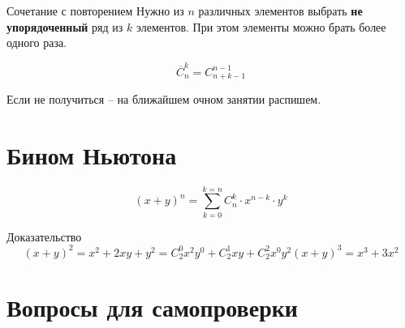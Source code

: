 \begin{frame}{Сочетание с повторением}
Нужно из
$n$
различных элементов 
выбрать \textbf{не упорядоченный}
ряд из $k$
элементов.
При этом элементы можно брать более одного раза.

\begin{equation}
\overline{C}_n^k = C_{n+k-1}^{n-1}
\end{equation}

Если не получиться -- на ближайшем очном занятии распишем.
	
\end{frame}

\section{Бином Ньютона}

\begin{frame}

\begin{equation}
\left( x + y\right)^n = \sum_{k=0}^{k=n} C_n^k \cdot x^{n-k} \cdot y^{k}
\end{equation}

Доказательство
\begin{equation*}
\left( x + y\right)^2 = x^2 + 2xy + y^2 = C_{2}^0 x^2 y^0 + C_{2}^{1} xy + C_{2}^{2}x^0y^2
\left( x + y\right)^3 = x^3 + 3x^2  
\end{equation*}


\end{frame}


\section{Вопросы для самопроверки}


